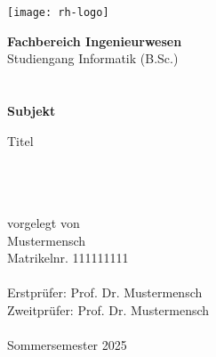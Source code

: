 \begin{titlepage}
 
    \texttt{[image: rh-logo]}\\[2cm]
    
    \begin{minipage}{\textwidth}
    \hspace{3cm}\begin{minipage}{\dimexpr\textwidth-3cm\relax}
    {\Large\textbf{Fachbereich Ingenieurwesen}}\\
    
    {\Large Studiengang Informatik (B.Sc.)}\\
    \\
    \\
    
    
    {\Large\textbf{Subjekt}}\\
    
    \parbox{\textwidth}{\Large\raggedright Titel}\\
    \\
    \\
    
    {\normalsize\fontsize{11pt}{16.5pt}\selectfont vorgelegt von}\\
    
    {\Large Mustermensch}\\
    
    {\normalsize\fontsize{11pt}{16.5pt}\selectfont Matrikelnr. 111111111}\\
    \\

    {\normalsize\fontsize{11pt}{16.5pt}\selectfont Erstprüfer: Prof. Dr. Mustermensch}\\
    {\normalsize\fontsize{11pt}{16.5pt}\selectfont Zweitprüfer: Prof. Dr. Mustermensch}\\
    \\
    
    {\normalsize Sommersemester 2025}
    \end{minipage}
    \end{minipage}
    
    \vfill
    
\end{titlepage}
